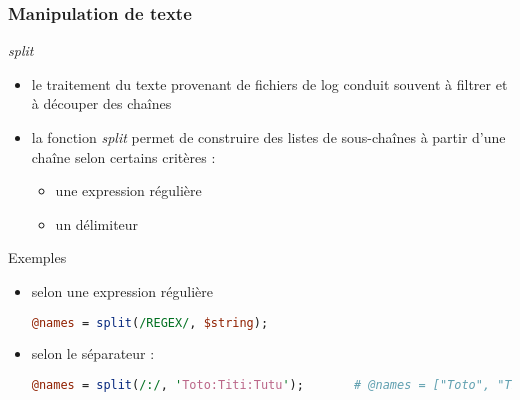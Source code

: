 \begin{frame}[fragile]
  \frametitle{Manipulation de texte}

  \begin{block}{\textit{split}}
    \begin{itemize}
    \item le traitement du texte provenant de fichiers de log conduit
      souvent à filtrer et à découper des chaînes
    \item la fonction \textit{split} permet de construire des listes de
      sous-chaînes à partir d'une chaîne selon certains critères :
      \begin{itemize}
      \item une expression régulière
      \item un délimiteur
      \end{itemize}
    \end{itemize}
  \end{block}

  \begin{exampleblock}{Exemples}
    \begin{itemize}
    \item selon une expression régulière
      \begin{lstlisting}[language=perl]
@names = split(/REGEX/, $string);
      \end{lstlisting}
    \item selon le séparateur :
      \begin{lstlisting}[language=perl]
@names = split(/:/, 'Toto:Titi:Tutu');       # @names = ["Toto", "Titi", "Tutu"]
      \end{lstlisting}
    \end{itemize}
  \end{exampleblock}
\end{frame}


